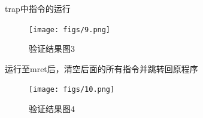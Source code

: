 trap中指令的运行
\begin{figure}[H] %
	\centering %
	\texttt{[image: figs/9.png]} %
	\caption{验证结果图3} %
	\label{Fig.21} %
\end{figure}
运行至mret后，清空后面的所有指令并跳转回原程序
\begin{figure}[H] %
	\centering %
	\texttt{[image: figs/10.png]} %
	\caption{验证结果图4} %
	\label{Fig.22} %
\end{figure}